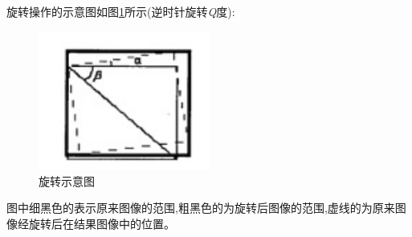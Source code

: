 \documentclass{XDBAthesis}
\begin{document}
旋转操作的示意图如图\ref{fg:roat}所示(逆时针旋转\emph{Q}度):
\begin{figure}[htb]
    \centering
    \includegraphics[width=0.5\textwidth]{figure/roat}
    \caption{旋转示意图}
    \label{fg:roat}
\end{figure}
      

图中细黑色的表示原来图像的范围,粗黑色的为旋转后图像的范围,虚线的为原来图像经旋转后在结果图像中的位置。
\end{document}

